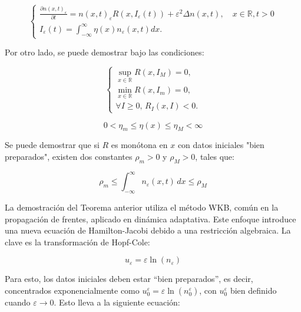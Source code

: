 {    \begin{equation}
        \left\{\begin{array}{l}
        \frac{\partial n(x, t)_\varepsilon}{\partial t}=n(x, t)_\varepsilon R(x, I_\varepsilon(t))+ \varepsilon^2 \Delta n(x, t), \quad x \in \mathbb{R}, t>0 \\
        I_\varepsilon(t)=\int_{-\infty}^{\infty} \eta(x) n_\varepsilon(x, t) d x .
        \end{array}\right.
    \end{equation}

    Por otro lado, se puede demostrar bajo las condiciones:

    \begin{equation*}
        \begin{cases}
        \sup_{x \in \mathbb{R}} R(x, I_M) = 0, \\
        \min_{x \in \mathbb{R}} R(x, I_m) = 0, \\
        \forall I \geq 0, \, R_I(x, I) < 0.
        \end{cases}
    \end{equation*}

    \begin{equation*}
        0< \eta_m \leq \eta(x) \leq \eta_M < \infty
    \end{equation*}

    Se puede demostrar que si $R$ es monótona en $x$ con datos iniciales "bien preparados", existen dos constantes $\rho_m >0$ y $\rho_M >0$, tales que:

    \begin{equation*}
        \rho_m \leq \int_{-\infty}^{\infty} n_\varepsilon(x,t) \, dx \leq \rho_M
    \end{equation*}
    
    \normalsize{La demostración del Teorema anterior utiliza el método WKB, común en la propagación de frentes, aplicado en dinámica adaptativa. Este enfoque introduce una nueva ecuación de Hamilton-Jacobi debido a una restricción algebraica. La clave es la transformación de Hopf-Cole:}

    \begin{equation}
         u_\varepsilon = \varepsilon \ln(n_\varepsilon)
    \end{equation}


    \normalsize{Para esto, los datos iniciales deben estar ``bien preparados'', es decir, concentrados exponencialmente como \( u_0^\varepsilon = \varepsilon \ln(n_0^\varepsilon) \), con \( u_0^\varepsilon \) bien definido cuando \( \varepsilon \to 0 \). Esto lleva a la siguiente ecuación:}

}
